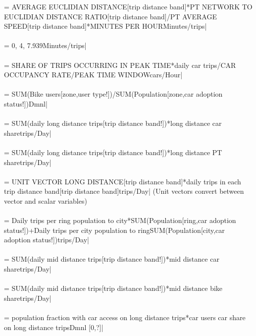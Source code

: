  = AVERAGE EUCLIDIAN DISTANCE[trip distance band]*PT NETWORK TO EUCLIDIAN DISTANCE RATIO[trip distance band]/PT AVERAGE SPEED[trip distance band]*MINUTES PER HOURMinutes/trips| \\ \\ 
 = 0, 4, 7.939Minutes/trips| \\ \\ 
 = SHARE OF TRIPS OCCURRING IN PEAK TIME*daily car trips/CAR OCCUPANCY RATE/PEAK TIME WINDOWcars/Hour| \\ \\ 
 = SUM(Bike users[zone,user type!])/SUM(Population[zone,car adoption status!])Dmnl| \\ \\ 
 = SUM(daily long distance trips[trip distance band!])*long distance car sharetrips/Day| \\ \\ 
 = SUM(daily long distance trips[trip distance band!])*long distance PT sharetrips/Day| \\ \\ 
 = UNIT VECTOR LONG DISTANCE[trip distance band]*daily trips in each trip distance band[trip distance band]trips/Day| (Unit vectors convert between vector and scalar variables) \\ \\ 
 = Daily trips per ring population to city*SUM(Population[ring,car adoption status!])+Daily trips per city population to ring\*SUM(Population[city,car adoption status!])trips/Day| \\ \\ 
 = SUM(daily mid distance trips[trip distance band!])*mid distance car sharetrips/Day| \\ \\ 
 = SUM(daily mid distance trips[trip distance band!])*mid distance bike sharetrips/Day| \\ \\ 
 = population fraction with car access on long distance trips*car users car share on long distance tripsDmnl [0,?]| \\ \\ 
